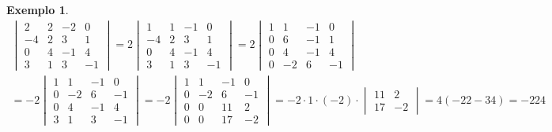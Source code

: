 \documentclass{article}
\newtheorem*{example}{Exemplo}
\begin{document}
\begin{example}
	\begin{align*}
	\begin{vmatrix}
	2 & 2 & -2 & 0 \\
	-4 & 2 & 3 & 1 \\
	0 & 4 & -1 & 4 \\
	3 & 1 & 3 & -1
	\end{vmatrix} = 2\begin{vmatrix}
	1 & 1 & -1 & 0 \\
	-4 & 2 & 3 & 1 \\
	0 & 4 & -1 & 4 \\
	3 & 1 & 3 & -1
	\end{vmatrix} = 2\begin{vmatrix}
	1 & 1 & -1 & 0 \\
	0 & 6 & -1 & 1 \\
	0 & 4 & -1 & 4 \\
	0 & -2 & 6 & -1
	\end{vmatrix} \\ 
	= -2\begin{vmatrix}
	1 & 1 & -1 & 0 \\
	0 & -2 & 6 & -1 \\
	0 & 4 & -1 & 4 \\
	3 & 1 & 3 & -1 
	\end{vmatrix} = -2\begin{vmatrix}
	1 & 1 & -1 & 0 \\
	0 & -2 & 6 & -1 \\
	0 & 0 & 11 & 2 \\
	0 & 0 & 17 & -2
	\end{vmatrix} = -2\cdot 1\cdot(-2)\cdot\begin{vmatrix}
	11 & 2 \\
	17 & -2
	\end{vmatrix} = 4(-22-34) = -224
	\end{align*}
\end{example}
\end{document}
